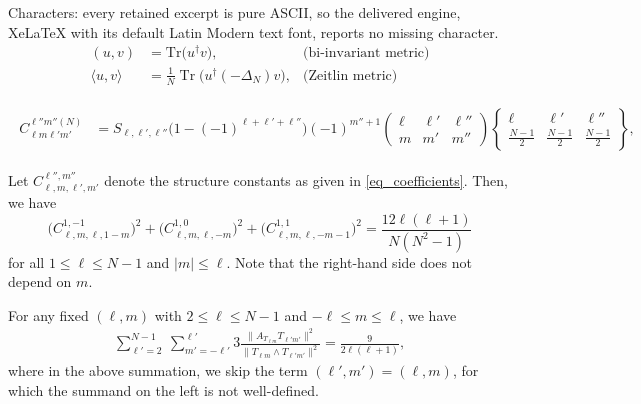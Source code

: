 \documentclass[10pt,a4paper]{amsart}
\begin{document}
Characters: every retained excerpt is pure ASCII, so the delivered engine, XeLaTeX with its default Latin Modern text font, reports no missing character.
\begin{align}
(u, v) &= \mathrm{Tr}\big(u^\dagger v\big), \qquad &\text{(bi-invariant metric)} \label{eq_biinvariant_metric}
\\
\langle u, v\rangle &= \frac{1}{N} \operatorname{Tr}\big(u^\dagger (-\Delta_N) v\big), &\text{(Zeitlin metric)} \label{eq_zeitlin_metric}
\end{align}

\begin{gather}\label{eq_coefficients}
\begin{split}
C_{\ell m\ell' m'}^{\ell'' m''(N)} &= S_{\ell,\ell',\ell''} \Big(1 - (-1)^{\ell + \ell' + \ell''}\Big)(-1)^{m''+1}
\left(\begin{matrix}
\ell & \ell' & \ell'' \\
m & m' & m''
\end{matrix}
\right)
\left\{\begin{matrix}
\ell & \ell' & \ell'' \\
\frac{N-1}{2} & \frac{N-1}{2} & \frac{N-1}{2}
\end{matrix}
\right\},
\end{split}
\end{gather}

\begin{lemma}\label{lemma_3_sum}
Let $C_{\ell,m,\ell',m'}^{\ell'',m''}$ denote the structure constants as given in \eqref{eq_coefficients}. Then, we have
\begin{equation}
\Big(C_{\ell,m,\ell,1-m}^{1,-1}\Big)^2 + 
\Big(C_{\ell,m,\ell,-m}^{1,0}\Big)^2 + 
\Big(C_{\ell,m,\ell,-m-1}^{1,1}\Big)^2 = \frac{12\ell(\ell+1)}{N(N^2-1)}
\end{equation}    
for all $1 \leq \ell \leq N-1$ and $|m| \leq \ell$. Note that the right-hand side does not depend on $m$.
\end{lemma}

\begin{lemma}\label{lemma_A_XY}
For any fixed $(\ell,m)$ with $2 \leq \ell \leq N-1$ and $-\ell \leq m \leq \ell$, we have
\begin{align*}
\sum\limits_{\ell' = 2}^{N-1}
~\sum\limits_{m' = -\ell'}^{\ell'} 3\frac{\|A_{T_{\ell m}}T_{\ell'm'}\|^2}{\|T_{\ell m} \wedge T_{\ell'm'}\|^2} = \frac{9}{2\ell(\ell+1)},
\end{align*}
where in the above summation, we skip the term $(\ell', m') = (\ell, m)$, for which the summand on the left is not well-defined.
\end{lemma}
\end{document}
